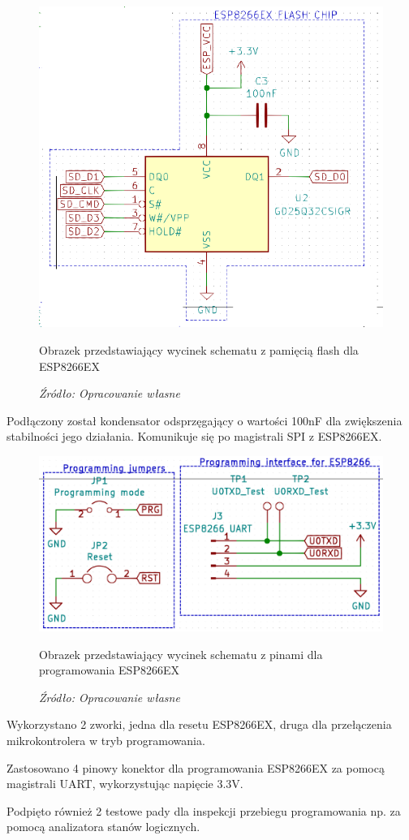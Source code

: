 \documentclass[12pt,a4paper,oneside]{memoir}
\begin{document}
\begin{figure}[!h]
	\centering
	\includegraphics[scale=1.2]{images/sch/sch-13.png}
	{\tytulyrozdzialow \footnotesize \caption[Schemat - pamięć flash] {Obrazek przedstawiający wycinek schematu z pamięcią flash dla ESP8266EX}}
	\caption*{\textit{Źródło: Opracowanie własne}}
\end{figure}
\par Podłączony został kondensator odsprzęgający o wartości 100nF dla zwiększenia stabilności jego działania. Komunikuje się po magistrali SPI z ESP8266EX.
\newpage
\begin{figure}[!h]
	\centering
	\includegraphics[scale=0.4]{images/sch/sch-14.png}
	{\tytulyrozdzialow \footnotesize \caption[Schemat - programowanie wewnątrzukładowe] {Obrazek przedstawiający wycinek schematu z pinami dla programowania ESP8266EX}}
	\caption*{\textit{Źródło: Opracowanie własne}}
\end{figure}
\par Wykorzystano 2 zworki, jedna dla resetu ESP8266EX, druga dla przełączenia mikrokontrolera w tryb programowania.
\par Zastosowano 4 pinowy konektor dla programowania ESP8266EX za pomocą magistrali UART, wykorzystując napięcie 3.3V. 
\par Podpięto również 2 testowe pady dla inspekcji przebiegu programowania np. za pomocą analizatora stanów logicznych. 
\newpage
\end{document}
